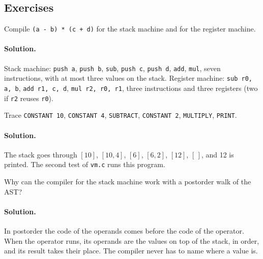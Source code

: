 \subsection{Exercises}

\begin{exercise}
Compile \texttt{(a - b) * (c + d)} for the stack machine and for the register
machine.
\end{exercise}

\paragraph{Solution.} Stack machine: \texttt{push a}, \texttt{push b},
\texttt{sub}, \texttt{push c}, \texttt{push d}, \texttt{add}, \texttt{mul}, seven
instructions, with at most three values on the stack. Register machine:
\texttt{sub r0, a, b}, \texttt{add r1, c, d}, \texttt{mul r2, r0, r1}, three
instructions and three registers (two if \texttt{r2} reuses \texttt{r0}).

\begin{exercise}
Trace \texttt{CONSTANT 10}, \texttt{CONSTANT 4}, \texttt{SUBTRACT},
\texttt{CONSTANT 2}, \texttt{MULTIPLY}, \texttt{PRINT}.
\end{exercise}

\paragraph{Solution.} The stack goes through $[10]$, $[10, 4]$, $[6]$, $[6, 2]$,
$[12]$, $[\,]$, and 12 is printed. The second test of \texttt{vm.c} runs this
program.

\begin{exercise}
Why can the compiler for the stack machine work with a postorder walk of the
AST?
\end{exercise}

\paragraph{Solution.} In postorder the code of the operands comes before the
code of the operator. When the operator runs, its operands are the values on
top of the stack, in order, and its result takes their place. The compiler
never has to name where a value is.

